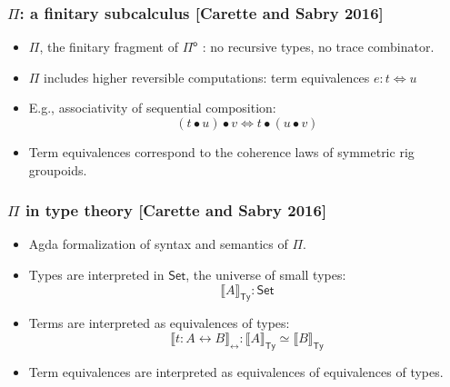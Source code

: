 \documentclass[12pt,t]{beamer}
\newcommand{\Pio}{\ensuremath{\mathsf{\Pi}^{\mathsf{o}}}}
\newcommand{\Set}{\mathsf{Set}}
\newcommand{\lr}{\longleftrightarrow}
\newcommand{\LR}{\iff}
\newcommand{\semTy}[1]{{\llbracket #1 \rrbracket}_\mathsf{Ty}}
\newcommand{\semTm}[1]{{\llbracket #1 \rrbracket}_{\lr}}
\begin{document}
\begin{frame}

  \frametitle{$\Pi$: a finitary subcalculus [Carette and Sabry 2016]}

  \begin{itemize}

  \item $\Pi$, the finitary fragment of $\Pio$ : no recursive types,
    no trace combinator.

  \item $\Pi$ includes higher reversible computations: term
    equivalences $e : t \LR u$
  \item E.g., associativity of sequential composition:
    \[
    (t \bullet u) \bullet v \LR t \bullet (u \bullet v)
    \]
  \item Term equivalences correspond to the coherence laws of
    symmetric rig groupoids.
    
  \end{itemize}
  
\end{frame}

\begin{frame}
  \frametitle{$\Pi$ in type theory [Carette and Sabry
      2016]}

  \begin{itemize}

  \item Agda formalization of syntax and
    semantics of $\Pi$.
  \item Types are interpreted in $\Set$, the universe of small types:
    \[
    \semTy A : \Set
    \]
  \item Terms are interpreted as equivalences of types:
    \[
    \semTm {t : A \lr B} : \semTy A \simeq \semTy B
    \]
  \item Term equivalences are interpreted as equivalences of
    equivalences of types.
  \end{itemize}
  
  
\end{frame}
\end{document}
